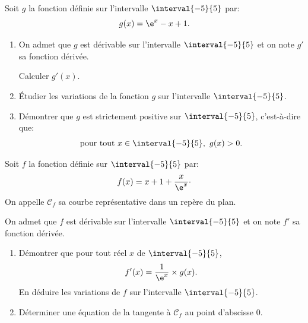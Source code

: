 \medskip
Soit $g$ la fonction définie sur l'intervalle $\interval{-5}{5}$ par:
\[
g(x)=\e^x-x+1.
\]
\begin{enumerate}
\item On admet que $g$ est dérivable sur l'intervalle $\interval{-5}{5}$ et on note $g'$ sa fonction dérivée.

Calculer $g'(x)$.

\item Étudier les variations de la fonction $g$ sur l'intervalle $\interval{-5}{5}$.
\item Démontrer que $g$ est strictement positive sur $\interval{-5}{5}$, c'est-à-dire que:
\[
\text{pour tout }x\in\interval{-5}{5},\ g(x)>0.
\]
\end{enumerate}
Soit $f$ la fonction définie sur $\interval{-5}{5}$ par:
\[
f(x)=x +1+\frac{x}{\e^x}\cdotp
\]
On appelle $\mathcal{C}_f$ sa courbe représentative dans un repère du plan.

On admet que $f$ est dérivable sur l'intervalle $\interval{-5}{5}$ et on note $f'$ sa fonction dérivée.
\begin{enumerate}[resume]
\item Démontrer que pour tout réel $x$ de $\interval{-5}{5}$,
\[
f'(x)=\frac{1}{\e^x}\times g(x).
\]
En déduire les variations de $f$ sur l'intervalle $\interval{-5}{5}$.
\item Déterminer une équation de la tangente à $\mathcal{C}_f$ au point d'abscisse 0.
\end{enumerate}
